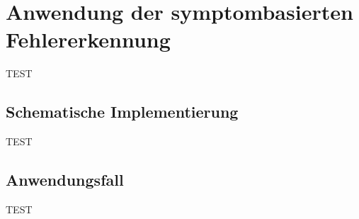 \chapter{Anwendung der symptombasierten Fehlererkennung}

TEST

\section{Schematische Implementierung}
TEST

\section{Anwendungsfall}
TEST


